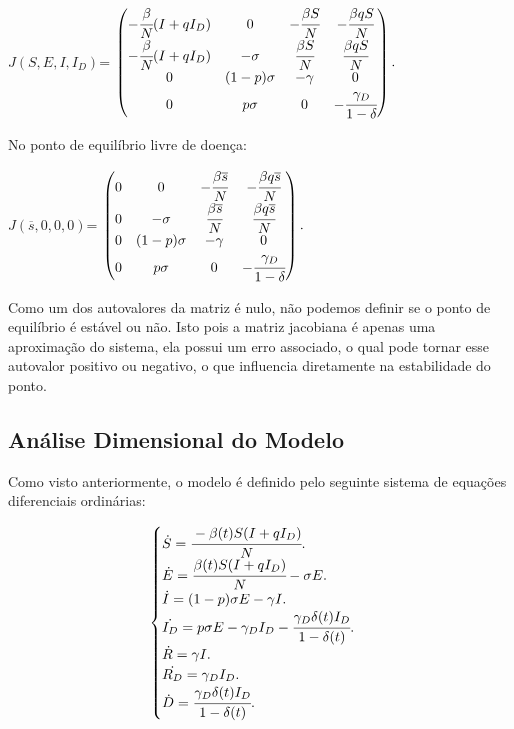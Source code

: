 \documentclass[12pt]{article}
\begin{document}
\begin{center}
$J(S,E, I, I_D)$=
$\begin{pmatrix} -\cfrac{\beta}{N} (I + qI_D) & 0 & -\cfrac{\beta S}{N}  & -\cfrac{\beta q S}{N} \\
-\cfrac{\beta}{N} (I + qI_D) & -\sigma &  \cfrac{\beta S}{N} & \cfrac{\beta q S}{N}\\
0 & (1-p)\sigma & -\gamma & 0 \\
0 & p \sigma & 0 & -\cfrac{\gamma_D}{ 1 - \delta}
\end{pmatrix}.$
\end{center}

No ponto de equilíbrio livre de doença:
\begin{center}
$J(\overline{s},0, 0, 0)$=
$\begin{pmatrix} 0 & 0 & -\cfrac{\beta \overline{s}}{N}  & -\cfrac{\beta q \overline{s}}{N} \\
0 & -\sigma &  \cfrac{\beta \overline{s}}{N} & \cfrac{\beta q \overline{s}}{N}\\
0 & (1-p)\sigma & -\gamma & 0 \\
0 & p \sigma & 0 & -\cfrac{\gamma_D}{ 1 - \delta}
\end{pmatrix}.$
\end{center}

Como um dos autovalores da matriz é nulo, não podemos definir se o ponto de equilíbrio é estável ou não. Isto pois a matriz jacobiana é apenas uma aproximação do sistema, ela possui um erro associado, o qual pode tornar esse autovalor positivo ou negativo, o que influencia diretamente na estabilidade do ponto.



\subsection{Análise Dimensional do Modelo}
Como visto anteriormente, o modelo é definido pelo seguinte sistema de equações diferenciais ordinárias:
\begin{center}
$$
\begin{cases}
\dot S = \cfrac{-\beta(t)S(I + qI_D)}{N}. \\
\dot E = \cfrac{\beta(t)S(I+ qI_D)}{N} - \sigma E .\\
\dot {I} = (1-p)\sigma E - \gamma I.\\
\dot {I_D} = p \sigma E - \gamma_DI_D - \cfrac{\gamma_D \delta (t)I_D}{1 - \delta(t)}.\\
\dot {R} = \gamma I.\\
\dot {R_D} = \gamma_DI_D.\\
\dot {D} = \cfrac{\gamma_D \delta (t)I_D}{1 - \delta(t)}.
\end{cases}
$$
\end{center}
\end{document}
